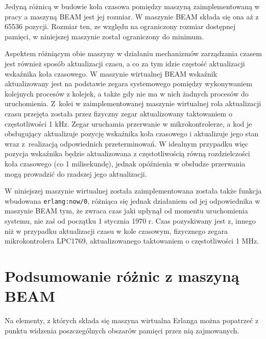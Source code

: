 Jedyną różnicą w budowie koła czasowa pomiędzy maszyną zaimplementowaną w pracy a maszyną BEAM jest jej rozmiar.
W maszynie BEAM składa się ona aż z 65536 pozycji.
Rozmiar ten, ze względu na ograniczony rozmiar dostępnej pamięci, w niniejszej maszynie został ograniczony do minimum.

Aspektem różniącym obie maszyny w działaniu mechanizmów zarządzania czasem jest również sposób aktualizacji czasu, a co za tym idzie częstość aktualizacji wskaźnika koła czasowego.
W maszynie wirtualnej BEAM wskaźnik aktualizowany jest na podstawie zegara systemowego pomiędzy wykonywaniem kolejnych procesów z kolejek, a także gdy nie ma w nich żadnych procesów do uruchomienia.
Z~kolei w zaimplementowanej maszynie wirtualnej rola aktualizacji czasu przejęta została przez fizyczny zegar aktualizowany taktowaniem o częstotliwości 1 kHz.
Zegar uruchamia przerwanie w mikrokontrolerze, a kod je obsługujący aktualizuje pozycję wskaźnika koła czasowego i aktualizuje jego stan wraz z~realizacją odpowiednich przeterminowań.
W idealnym przypadku więc pozycja wskaźnika będzie aktualizowana z częstotliwością równą rozdzielczości koła czasowego (co 1 milisekundę), jednak opóźnienia w obsłudze przerwania mogą prowadzić do rzadszej jego aktualizacji.

W niniejszej maszynie wirtualnej została zaimplementowana została także funkcja wbudowana \texttt{erlang:now/0}, różniąca się jednak działaniem od jej odpowiednika w maszynie BEAM tym, że zwraca czas jaki upłynął od momentu uruchomienia systemu, nie zaś od początku 1 stycznia 1970 r.
Czas pozyskiwany jest z, innego niż w przypadku aktualizacji czasu w kole czasowym, fizycznego zegara mikrokontrolera LPC1769, aktualizowanego taktowaniem o częstotliwości 1 MHz.

\section{Podsumowanie różnic z maszyną BEAM}
\label{sec:maszynaPodsumowanie}

Na elementy, z których składa się maszyna wirtualna Erlanga można popatrzeć z punktu widzenia poszczególnych obszarów pamięci przez nią zajmowanych.

